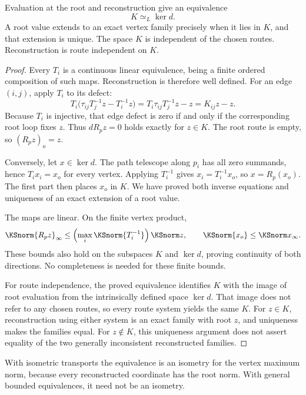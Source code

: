 \begin{KStheorem}\label{KS:KS41}
Evaluation at the root and reconstruction give an equivalence
\[
 K\simeq_L\ker d.
\]
A root value extends to an exact vertex family precisely when it lies in \(K\), and that extension is unique. The space \(K\) is independent of the chosen routes. Reconstruction is route independent on \(K\).
\end{KStheorem}
\begin{proof}
Every \(T_i\) is a continuous linear equivalence, being a finite ordered composition of such maps. Reconstruction is therefore well defined. For an edge \((i,j)\), apply \(T_i\) to its defect:
\[
 T_i\bigl(\tau_{ij}T_j^{-1}z-T_i^{-1}z\bigr)
 =T_i\tau_{ij}T_j^{-1}z-z=K_{ij}z-z.
\]
Because \(T_i\) is injective, that edge defect is zero if and only if the corresponding root loop fixes \(z\). Thus \(dR_pz=0\) holds exactly for \(z\in K\). The root route is empty, so \((R_pz)_o=z\).

Conversely, let \(x\in\ker d\). The path telescope along \(p_i\) has all zero summands, hence \(T_ix_i=x_o\) for every vertex. Applying \(T_i^{-1}\) gives \(x_i=T_i^{-1}x_o\), so \(x=R_p(x_o)\). The first part then places \(x_o\) in \(K\). We have proved both inverse equations and uniqueness of an exact extension of a root value.

The maps are linear. On the finite vertex product,
\[
 \KSnorm{R_pz}_\infty\le\left(\max_i\KSnorm{T_i^{-1}}\right)\KSnorm z,
 \qquad \KSnorm{x_o}\le\KSnorm x_\infty.
\]
These bounds also hold on the subspaces \(K\) and \(\ker d\), proving continuity of both directions. No completeness is needed for these finite bounds.

For route independence, the proved equivalence identifies \(K\) with the image of root evaluation from the intrinsically defined space \(\ker d\). That image does not refer to any chosen routes, so every route system yields the same \(K\). For \(z\in K\), reconstruction using either system is an exact family with root \(z\), and uniqueness makes the families equal. For \(z\notin K\), this uniqueness argument does not assert equality of the two generally inconsistent reconstructed families.
\end{proof}
With isometric transports the equivalence is an isometry for the vertex maximum norm, because every reconstructed coordinate has the root norm. With general bounded equivalences, it need not be an isometry.

